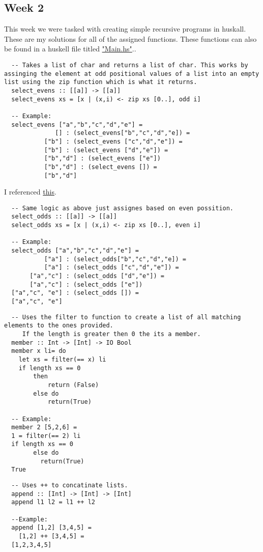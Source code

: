\documentclass{article}
\theoremstyle{theorem}
\theoremstyle{definition}
\theoremstyle{remark}
\begin{document}
\subsection{Week 2}
This week we were tasked with creating simple recursive programs in huskall. These are my solutions for all of the assigned functions. These functions can also be found in a huskell
file titled \href{https://github.com/jacgoldberg/Programming-Lang/blob/main/Main.hs}{"Main.hs"}..
\begin{lstlisting}
  -- Takes a list of char and returns a list of char. This works by assinging the element at odd positional values of a list into an empty list using the zip function which is what it returns.
  select_evens :: [[a]] -> [[a]]
  select_evens xs = [x | (x,i) <- zip xs [0..], odd i]

  -- Example:
  select_evens ["a","b","c","d","e"] =
              [] : (select_evens["b","c","d","e]) = 
           ["b"] : (select_evens ["c","d","e"]) = 
           ["b"] : (select_evens ["d","e"]) = 
           ["b","d"] : (select_evens ["e"])
           ["b","d"] : (select_evens []) =
           ["b","d"]

\end{lstlisting}
I referenced \href{https://stackoverflow.com/questions/49741305/how-to-pick-elements-in-even-index-and-odd-index}{this}.
\begin{lstlisting}
  -- Same logic as above just assignes based on even possition.
  select_odds :: [[a]] -> [[a]]
  select_odds xs = [x | (x,i) <- zip xs [0..], even i]

  -- Example:
  select_odds ["a","b","c","d","e"] = 
           ["a"] : (select_odds["b","c","d","e]) = 
           ["a"] : (select_odds ["c","d","e"]) = 
       ["a","c"] : (select_odds ["d","e"]) = 
       ["a","c"] : (select_odds ["e"])
  ["a","c", "e"] : (select_odds []) =
  ["a","c", "e"]
\end{lstlisting}
\begin{lstlisting}
  -- Uses the filter to function to create a list of all matching elements to the ones provided.
     If the length is greater then 0 the its a member.
  member :: Int -> [Int] -> IO Bool
  member x li= do
    let xs = filter(== x) li
    if length xs == 0
        then 
            return (False)
        else do
            return(True)
    
  -- Example: 
  member 2 [5,2,6] =
  1 = filter(== 2) li
  if length xs == 0
        else do
          return(True)
  True
\end{lstlisting}
\begin{lstlisting}
  -- Uses ++ to concatinate lists.
  append :: [Int] -> [Int] -> [Int]
  append l1 l2 = l1 ++ l2 

  --Example:
  append [1,2] [3,4,5] = 
    [1,2] ++ [3,4,5] =
  [1,2,3,4,5]
\end{lstlisting}
\end{document}
